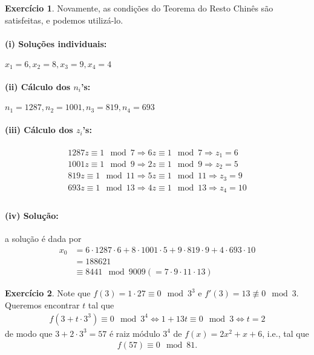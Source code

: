 \documentclass[a4paper,12pt]{article}
\theoremstyle{definition}
\newtheorem{exercise}{Exercício}%
\begin{document}
	\begin{exercise}
		Novamente, as condições do Teorema do Resto Chinês são satisfeitas, e podemos utilizá-lo.
		\paragraph{(i) Soluções individuais:} $x_1 = 6, x_2 = 8, x_3 = 9, x_4 = 4$
		\paragraph{(ii) Cálculo dos $n_i$'s:} $n_1 = 1287, n_2 = 1001, n_3 = 819, n_4 = 693$
		\paragraph{(iii) Cálculo dos $z_i$'s:} 
		\begin{align*}
		1287z\equiv 1\mod 7 \Rightarrow 6z\equiv 1\mod 7 \Rightarrow z_1 = 6 \\
		1001z\equiv 1\mod 9 \Rightarrow 2z\equiv 1\mod 9 \Rightarrow z_2 = 5 \\
		819z\equiv 1\mod 11 \Rightarrow 5z\equiv 1\mod 11 \Rightarrow z_3 = 9 \\
		693z\equiv 1\mod 13 \Rightarrow 4z\equiv 1\mod 13 \Rightarrow z_4 = 10 \\
		\end{align*}
		\paragraph{(iv) Solução:} a solução é dada por
		\begin{align*}
		x_0 &= 6\cdot 1287\cdot 6 + 8\cdot 1001\cdot 5 + 9\cdot 819\cdot 9 + 4\cdot 693\cdot 10 \\
		&= 188621 \\
		&\equiv 8441\mod 9009 (=7\cdot 9\cdot 11\cdot 13)
		\end{align*}
	\end{exercise}
	\begin{exercise}
		Note que $f(3) = 1\cdot 27\equiv 0\mod 3^3$ e $f'(3) = 13\not\equiv 0\mod 3$. Queremos encontrar $t$ tal que
		\begin{align*}
		f(3 + t\cdot 3^3) \equiv 0\mod 3^4 \Longleftrightarrow 1 + 13t\equiv 0\mod 3 \Longleftrightarrow t = 2
		\end{align*}
		de modo que $3 + 2\cdot 3^3 = 57$ é raiz módulo $3^4$ de $f(x) = 2x^2 + x + 6$, i.e., tal que
		\begin{align*}
		f(57)\equiv 0\mod 81.
		\end{align*} 
	\end{exercise}
\end{document}
